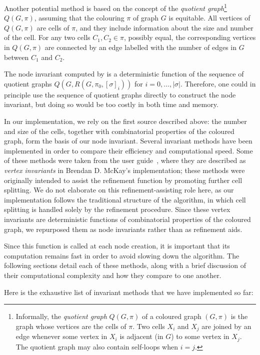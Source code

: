 Another potential method is based on the concept of the \textit{quotient graph}\footnote{Informally, the \emph{quotient graph} $Q(G,\pi)$ of a coloured graph $(G,\pi)$ is the graph whose vertices are the cells of $\pi$. Two cells $X_i$ and $X_j$ are joined by an edge whenever some vertex in $X_i$ is adjacent (in $G$) to some vertex in $X_j$. The quotient graph may also contain self-loops when $i=j$.} $Q(G,\pi)$, assuming that the colouring $\pi$ of graph $G$ is equitable. All vertices of $Q(G,\pi)$ are cells of $\pi$, and they include information about the size and number of the cell. For any two cells $C_1, C_2 \mathrel{\in}\pi$, possibly equal, the corresponding vertices in $Q(G,\pi)$ are connected by an edge labelled with the number of edges in $G$ between $C_1$ and $C_2$.

The node invariant computed by \Naut{} is a deterministic function of the sequence of quotient graphs $Q(G, R(G, \pi_0, [\sigma]_i))$ for $i = 0, \ldots, |\sigma|$. Therefore, one could in principle use the sequence of quotient graphs directly to construct the node invariant, but doing so would be too costly in both time and memory.

In our implementation, we rely on the first source described above: the number and size of the cells, together with combinatorial properties of the coloured graph, form the basis of our node invariant. Several invariant methods have been implemented in order to compare their efficiency and computational speed. Some of these methods were taken from the \Naut{} user guide~\cite{mckay2024nug}, where they are described as \textit{vertex invariants} in Brendan D. McKay's implementation; these methods were originally intended to assist the refinement function by promoting further cell splitting. We do not elaborate on this refinement-assisting role here, as our implementation follows the traditional structure of the algorithm, in which cell splitting is handled solely by the refinement procedure. Since these vertex invariants are deterministic functions of combinatorial properties of the coloured graph, we repurposed them as node invariants rather than as refinement aids.

Since this function is called at each node creation, it is important that its computation remains fast in order to avoid slowing down the algorithm. The following sections detail each of these methods, along with a brief discussion of their computational complexity and how they compare to one another.

Here is the exhaustive list of invariant methods that we have implemented so far:

